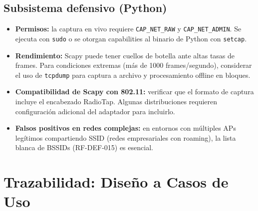 \documentclass[11pt,a4paper]{article}
\begin{document}
\subsection{Subsistema defensivo (Python)}

\begin{itemize}
  \item \textbf{Permisos:} la captura en vivo requiere
    \texttt{CAP\_NET\_RAW} y \texttt{CAP\_NET\_ADMIN}. Se ejecuta con
    \texttt{sudo} o se otorgan capabilities al binario de Python con
    \texttt{setcap}.
  \item \textbf{Rendimiento:} Scapy puede tener cuellos de botella ante
    altas tasas de frames. Para condiciones extremas (más de 1000
    frames/segundo), considerar el uso de \texttt{tcpdump} para captura
    a archivo y procesamiento offline en bloques.
  \item \textbf{Compatibilidad de Scapy con 802.11:} verificar que el
    formato de captura incluye el encabezado RadioTap. Algunas
    distribuciones requieren configuración adicional del adaptador para
    incluirlo.
  \item \textbf{Falsos positivos en redes complejas:} en entornos con
    múltiples APs legítimos compartiendo SSID (redes empresariales con
    roaming), la lista blanca de BSSIDs (RF-DEF-015) es esencial.
\end{itemize}

\section{Trazabilidad: Diseño a Casos de Uso}
\end{document}
